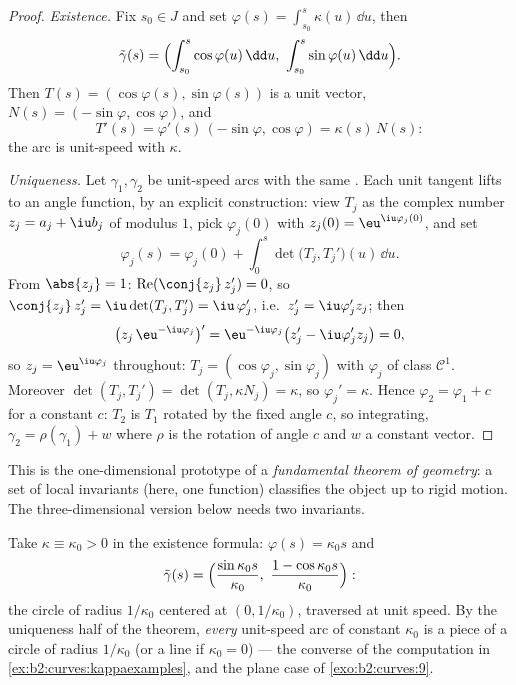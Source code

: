 \begin{proof}
\emph{Existence.} Fix $s_0 \in J$ and set $\varphi(s) =
\int_{s_0}^s \kappa(u)\,\dd u$, then
\[
\tilde\gamma(s) = \Bigl(\int_{s_0}^s \cos\varphi(u)\,\dd u,\
\int_{s_0}^s \sin\varphi(u)\,\dd u\Bigr).
\]
Then $T(s) = (\cos\varphi(s), \sin\varphi(s))$ is a unit vector,
$N(s) = (-\sin\varphi, \cos\varphi)$, and
\[
T'(s) = \varphi'(s)\,(-\sin\varphi, \cos\varphi)
= \kappa(s)\,N(s) :
\]
the arc is unit-speed with  $\kappa$.

\emph{Uniqueness.} Let $\gamma_1, \gamma_2$ be unit-speed arcs with
the same \omterm{thm:b2:curves:frenet2d}{curvature}. Each unit tangent lifts to an angle
function, by an explicit construction: view $T_j$ as the
complex number $z_j = a_j + \iu b_j$ of modulus $1$, pick
$\varphi_j(0)$ with $z_j(0) = \eu^{\iu\varphi_j(0)}$, and set
\[
\varphi_j(s) = \varphi_j(0) + \int_0^s\det\bigl(T_j,
T_j'\bigr)(u)\,\dd u .
\]
From $\abs{z_j} = 1$: $\operatorname{Re}(\conj{z_j}\,z_j') =
0$, so $\conj{z_j}\,z_j' = \iu\det(T_j, T_j') =
\iu\,\varphi_j'$, i.e.\ $z_j' = \iu\varphi_j'z_j$; then
\[
\bigl(z_j\,\eu^{-\iu\varphi_j}\bigr)'
= \eu^{-\iu\varphi_j}\bigl(z_j' - \iu\varphi_j'z_j\bigr) = 0,
\]
so $z_j = \eu^{\iu\varphi_j}$ throughout: $T_j =
(\cos\varphi_j, \sin\varphi_j)$ with $\varphi_j$ of class
$\mathcal C^1$. Moreover $\det(T_j, T_j') = \det(T_j,
\kappa N_j) = \kappa$, so $\varphi_j' = \kappa$. Hence $\varphi_2 = \varphi_1 + c$ for a
constant $c$: $T_2$ is $T_1$ rotated by the fixed angle $c$, so
integrating, $\gamma_2 = \rho(\gamma_1) + w$ where $\rho$ is the
rotation of angle $c$ and $w$ a constant vector.
\end{proof}

\begin{remark}
This is the one-dimensional prototype of a \emph{fundamental
theorem of geometry}: a  set of local invariants (here, one
function) classifies the object up to rigid motion. The
three-dimensional version below needs two invariants.
\end{remark}

\begin{example}\label{ex:b2:curves:constantkappa}
Take $\kappa \equiv \kappa_0 > 0$ in the existence formula:
$\varphi(s) = \kappa_0 s$ and
\[
\tilde\gamma(s) = \Bigl(\frac{\sin\kappa_0s}{\kappa_0},\
\frac{1 - \cos\kappa_0s}{\kappa_0}\Bigr) :
\]
the circle of radius $1/\kappa_0$ centered at $(0,
1/\kappa_0)$, traversed at unit speed. By the uniqueness
half of the theorem, \emph{every} unit-speed arc of constant
\omterm{thm:b2:curves:frenet2d}{curvature} $\kappa_0$ is a piece of a circle of radius
$1/\kappa_0$ (or a line if $\kappa_0 = 0$) --- the converse
of the computation in \cref{ex:b2:curves:kappaexamples}, and
the plane case of \cref{exo:b2:curves:9}.
\end{example}

